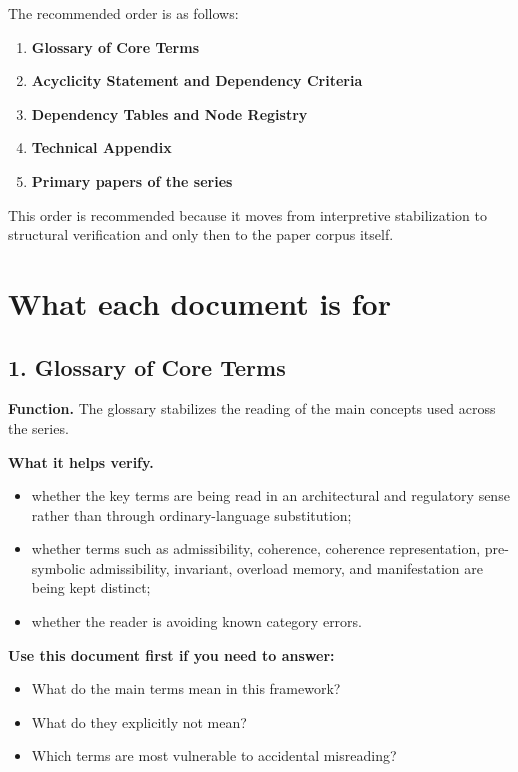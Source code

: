 \documentclass[11pt,a4paper]{article}
\begin{document}
The recommended order is as follows:

\begin{enumerate}[leftmargin=2em]
	\item \textbf{Glossary of Core Terms}
	\item \textbf{Acyclicity Statement and Dependency Criteria}
	\item \textbf{Dependency Tables and Node Registry}
	\item \textbf{Technical Appendix}
	\item \textbf{Primary papers of the series}
\end{enumerate}

This order is recommended because it moves from interpretive stabilization to structural
verification and only then to the paper corpus itself.

\section{What each document is for}

\subsection{1. Glossary of Core Terms}

\textbf{Function.}  
The glossary stabilizes the reading of the main concepts used across the series.

\textbf{What it helps verify.}
\begin{itemize}[leftmargin=2em]
	\item whether the key terms are being read in an architectural and regulatory sense rather
	than through ordinary-language substitution;
	\item whether terms such as admissibility, coherence, coherence representation,
	pre-symbolic admissibility, invariant, overload memory, and manifestation are being kept distinct;
	\item whether the reader is avoiding known category errors.
\end{itemize}

\textbf{Use this document first if you need to answer:}
\begin{itemize}[leftmargin=2em]
	\item What do the main terms mean in this framework?
	\item What do they explicitly not mean?
	\item Which terms are most vulnerable to accidental misreading?
\end{itemize}
\end{document}
